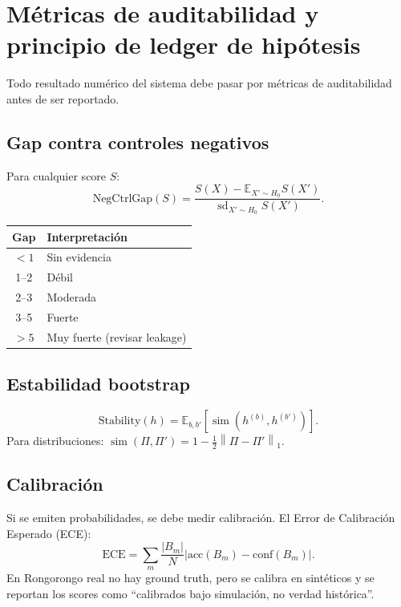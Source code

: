 \documentclass[11pt,a4paper]{article}
\newcommand{\E}{\mathbb{E}}
\newcommand{\1}{\mathbf{1}}
\newcommand{\norm}[1]{\left\lVert #1 \right\rVert}
\numberwithin{equation}{section}
\begin{document}
\section{Métricas de auditabilidad y principio de ledger de hipótesis}
\label{sec:auditability}

Todo resultado numérico del sistema debe pasar por métricas de auditabilidad antes de ser reportado.

\subsection{Gap contra controles negativos}

Para cualquier score $S$:
\begin{equation}
    \mathrm{NegCtrlGap}(S)
    =
    \frac{S(X)-\E_{X'\sim H_0}S(X')}{\operatorname{sd}_{X'\sim H_0}S(X')}.
\end{equation}

\begin{center}
\begin{tabular}{cl}
\toprule
Gap & Interpretación \\
\midrule
$<1$ & Sin evidencia \\
1--2 & Débil \\
2--3 & Moderada \\
3--5 & Fuerte \\
$>5$ & Muy fuerte (revisar leakage) \\
\bottomrule
\end{tabular}
\end{center}

\subsection{Estabilidad bootstrap}

\begin{equation}
    \mathrm{Stability}(h)=\E_{b,b'}\left[\operatorname{sim}(h^{(b)},h^{(b')})\right].
\end{equation}
Para distribuciones: $\operatorname{sim}(\Pi,\Pi')=1-\frac{1}{2}\norm{\Pi-\Pi'}_1$.

\subsection{Calibración}

Si se emiten probabilidades, se debe medir calibración. El Error de Calibración Esperado (ECE):
\begin{equation}
    \mathrm{ECE}=\sum_m\frac{|B_m|}{N}\left|\mathrm{acc}(B_m)-\mathrm{conf}(B_m)\right|.
\end{equation}
En Rongorongo real no hay ground truth, pero se calibra en sintéticos y se reportan los scores como ``calibrados bajo simulación, no verdad histórica''.
\end{document}
